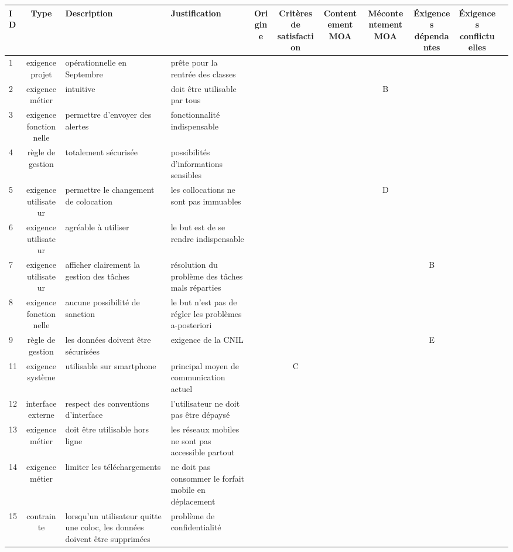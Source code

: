\documentclass[a4paper, 12pt, french, landscape]{article}
\begin{document}
  \scriptsize
	\begin{longtable}{|l|c|l|l|c|c|c|c|c|c|c|}
 	\hline
  	ID & Type & Description & Justification & Origine & Critères de satisfaction & Contentement MOA & Mécontentement MOA & Éxigences dépendantes & Éxigences conflictuelles & \\ \hline
  	\hline
    1 & exigence projet & opérationnelle en Septembre & prête pour la rentrée des classes & & & & & &  \\ \hline
    2 & exigence métier & intuitive & doit être utilisable par tous & & & & B & &  \\ \hline
    3 & exigence fonctionnelle & permettre d'envoyer des alertes & fonctionnalité indispensable & & & & & &  \\ \hline
    4 & règle de gestion & totalement sécurisée & possibilités d'informations sensibles & & & & & &  \\ \hline
    5 & exigence utilisateur & permettre le changement de colocation & les collocations ne sont pas immuables     & & & & D& &  \\ \hline
    6 & exigence utilisateur & agréable à utiliser & le but est de se rendre indispensable & & & & & & &  \\ \hline
    7 & exigence utilisateur & afficher clairement la gestion des tâches & résolution du problème des tâches mals réparties & & & & & B& &  \\ \hline
    8 & exigence fonctionnelle & aucune possibilité de sanction & le but n'est pas de régler les problèmes a-posteriori & & & & & & &  \\ \hline
    9 & règle de gestion & les données doivent être sécurisées & exigence de la CNIL & & & & & E& &  \\ \hline
    11 & exigence système & utilisable sur smartphone & principal moyen de communication actuel & & C & & & & &  \\ \hline
    12 & interface externe & respect des conventions d'interface & l'utilisateur ne doit pas être dépaysé & & & & & & &  \\ \hline
    13 & exigence métier & doit être utilisable hors ligne & les réseaux mobiles ne sont pas accessible partout & & & & & & &  \\ \hline
    14 & exigence métier & limiter les téléchargements & ne doit pas consommer le forfait mobile en déplacement & & & & & & &  \\ \hline
    15 & contrainte & lorsqu'un utilisateur quitte une coloc, les données doivent être supprimées & problème de confidentialité & & & & & & &  \\ \hline
	\end{longtable}
\end{document}
